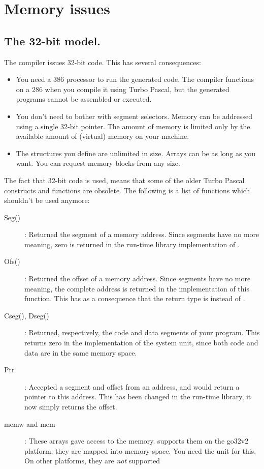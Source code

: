 \chapter{Memory issues}
\label{ch:Memory}

\section{The 32-bit model.}
\label{se:ThirtytwoBit}
The \fpc compiler issues 32-bit code. This has several consequences:
\begin{itemize}
\item You need a 386 processor to run the generated code. The
compiler functions on a 286 when you compile it using Turbo Pascal,
but the generated programs cannot be assembled or executed.
\item You don't need to bother with segment selectors. Memory can be
addressed using a single 32-bit pointer.
The amount of memory is limited only by the available amount of (virtual)
memory on your machine.
\item The structures you define are unlimited in size. Arrays can be as long
as you want. You can request memory blocks from any size.
\end{itemize}

The fact that 32-bit code is used, means that some of the older Turbo Pascal
constructs and functions are obsolete. The following is a list of functions
which shouldn't be used anymore:
\begin{description}
\item [Seg()]: Returned the segment of a memory address. Since segments have
no more meaning, zero is returned in the \fpc run-time library implementation of
.
\item [Ofs()]: Returned the offset of a memory address. Since segments have
no more meaning, the complete address is returned in the \fpc implementation
of this function. This has as a consequence that the return type is
 instead of .
\item [Cseg(), Dseg()]: Returned, respectively, the code and data segments
of your program.  This returns zero in the \fpc implementation of the
system unit, since both code and data are in the same memory space.
\item [Ptr]: Accepted a segment and offset from an address, and would return
a pointer to this address. This has been changed in the run-time library, it
now simply returns the offset.
\item [memw and mem]: These arrays gave access to the \dos memory. \fpc
supports them on the go32v2 platform, they are mapped into \dos memory
space. You need the  unit for this. On other platforms, they are
{\em not} supported
\end{description}

